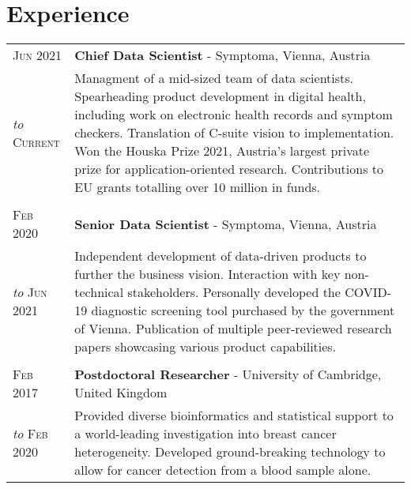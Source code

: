 \section{Experience}
\begin{tabular}{>{\raggedleft}p{2.15cm}|p{12cm}}

    \textsc{Jun 2021} &  \textbf{Chief Data Scientist} - Symptoma, Vienna, Austria \\
	\emph{to} \textsc{Current} & Managment of a mid-sized team of data scientists. Spearheading product development in digital health, including work on electronic health records and symptom checkers. Translation of C-suite vision to implementation. Won the Houska Prize 2021, Austria's largest private prize for application-oriented research. Contributions to EU grants totalling over 10 million in funds. \\
	
	\multicolumn{2}{c}{}\\

    \textsc{Feb 2020} & \textbf{Senior Data Scientist} - Symptoma, Vienna, Austria \\
	\emph{to} \textsc{Jun 2021} & Independent development of data-driven products to further the business vision. Interaction with key non-technical stakeholders. Personally developed the COVID-19 diagnostic screening tool purchased by the government of Vienna. Publication of multiple peer-reviewed research papers showcasing various product capabilities. \\
	
	\multicolumn{2}{c}{}\\
	
    \textsc{Feb 2017} &  \textbf{Postdoctoral Researcher} - University of Cambridge, United Kingdom\\
	\emph{to} \textsc{Feb 2020} & Provided diverse bioinformatics and statistical support to a world-leading investigation into breast cancer heterogeneity. Developed ground-breaking technology to allow for cancer detection from a blood sample alone. \\
	
	
	

\end{tabular}
